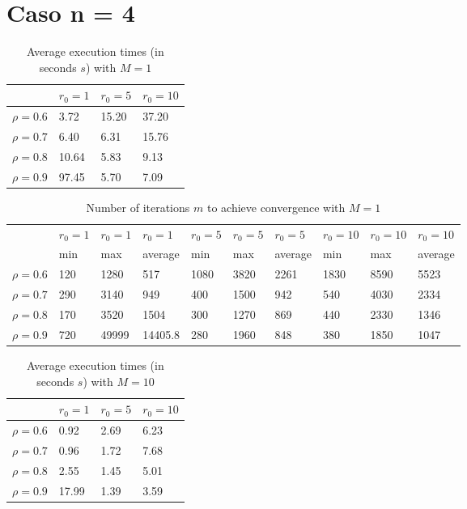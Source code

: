 \documentclass[a4paper,11pt,openright]{report}
\begin{document}
\section*{Caso n = 4} 
\begin{table}[H]
\centering
\addtolength{\leftskip}{-1.5cm}
\addtolength{\rightskip}{-1.5cm}
\begin{tabular}{|c|lll|}
\hline
$ $ & $r_0 = 1$ & $r_0 = 5$ & $r_0 = 10$ \\
\hline
$\rho = 0.6$ & 3.72 & 15.20 & 37.20 \\

$\rho = 0.7$ & 6.40 & 6.31 & 15.76 \\

$\rho = 0.8$ & 10.64 & 5.83 & 9.13 \\

$\rho = 0.9$ & 97.45 & 5.70 & 7.09 \\
\hline
\end{tabular}
\caption{Average execution
 times (in seconds $s$) with $M = 1$}
\end{table}
\begin{table}[H]
\centering
\addtolength{\leftskip}{-1.5cm}
\addtolength{\rightskip}{-1.5cm}
\begin{tabular}{|c|lllllllll|}
\hline
$ $ & $r_0 = 1$ & $r_0 = 1$ & $r_0 = 1$ & $r_0 = 5$ & $r_0 = 5$ & $r_0 = 5$ & $r_0 = 10$ & $r_0 = 10$ & $r_0 = 10$  \\
$ $ & min & max & average & min & max & average & min & max & average \\ 
\hline
$\rho = 0.6$ & 120 & 1280 & 517 & 1080 & 3820 & 2261 & 1830 & 8590 & 5523 \\

$\rho = 0.7$ & 290 & 3140 & 949 & 400 & 1500 & 942 & 540 & 4030 & 2334\\

$\rho = 0.8$ & 170 & 3520 & 1504 & 300 & 1270 & 869 & 440 & 2330 & 1346\\

$\rho = 0.9$ & 720 & 49999 & 14405.8 & 280 & 1960 & 848 & 380 & 1850 & 1047\\
\hline
\end{tabular}
\caption{Number of iterations $m$ to achieve convergence with $M = 1$}
\end{table}
\begin{table}[H]
\centering
\addtolength{\leftskip}{-1.5cm}
\addtolength{\rightskip}{-1.5cm}
\begin{tabular}{|c|lll|}
\hline
$ $ & $r_0 = 1$ & $r_0 = 5$ & $r_0 = 10$ \\
\hline
$\rho = 0.6$ & 0.92 & 2.69 & 6.23 \\

$\rho = 0.7$ & 0.96 & 1.72 & 7.68 \\

$\rho = 0.8$ & 2.55 & 1.45 & 5.01 \\

$\rho = 0.9$ & 17.99 & 1.39 & 3.59 \\
\hline
\end{tabular}
\caption{Average execution
 times (in seconds $s$) with $M = 10$}
\end{table}
\end{document}

